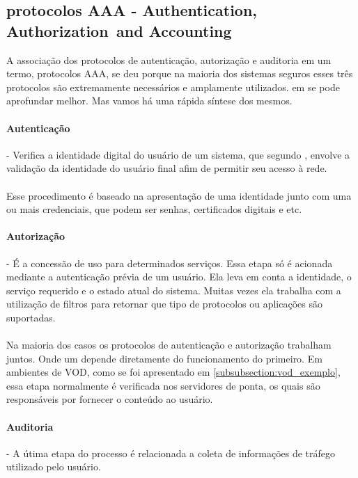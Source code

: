 \subsection{protocolos AAA - Authentication,
Authorization\, and Accounting}
\label{subsection:AAA}
A associa\c{c}\~ao dos protocolos de autentica\c{c}\~ao, autoriza\c{c}\~ao e auditoria em um termo, protocolos AAA, se deu porque na maioria dos sistemas seguros esses tr\^es protocolos s\~ao extremamente necess\'arios e amplamente utilizados. em \cite{metz1999aaa} se pode aprofundar melhor. Mas vamos h\'a uma r\'apida s\'intese dos mesmos.
\paragraph{Autentica\c{c}\~ao}- Verifica a identidade digital do usu\'ario de um sistema, que segundo \cite{metz1999aaa}, envolve a valida\c{c}\~ao da identidade do usu\'ario final afim de permitir seu acesso \`a rede.
\paragraph{}
Esse procedimento \'e baseado na apresenta\c{c}\~ao de uma identidade junto com uma ou mais credenciais, que podem ser senhas, certificados digitais e etc.
\paragraph{Autoriza\c{c}\~ao}- \'E a concess\~ao de uso para determinados servi\c{c}os. Essa etapa s\'o \'e acionada mediante a autentica\c{c}\~ao pr\'evia de um usu\'ario. Ela leva em conta a identidade, o servi\c{c}o requerido e o estado atual do sistema. Muitas vezes ela trabalha com a utiliza\c{c}\~ao de filtros para retornar que tipo de protocolos ou aplica\c{c}\~oes s\~ao suportadas.
\paragraph{}
Na maioria dos casos os protocolos de autentica\c{c}\~ao e autoriza\c{c}\~ao trabalham juntos. Onde um depende diretamente do funcionamento do primeiro. Em ambientes de VOD, como se foi apresentado em \ref{subsubsection:vod_exemplo}, essa etapa normalmente \'e verificada nos servidores de ponta, os quais s\~ao respons\'aveis por fornecer o conte\'udo ao usu\'ario.
\paragraph{Auditoria}- A \'utima etapa do processo \'e relacionada a coleta de informa\c{c}\~oes de tr\'afego utilizado pelo usu\'ario. 
